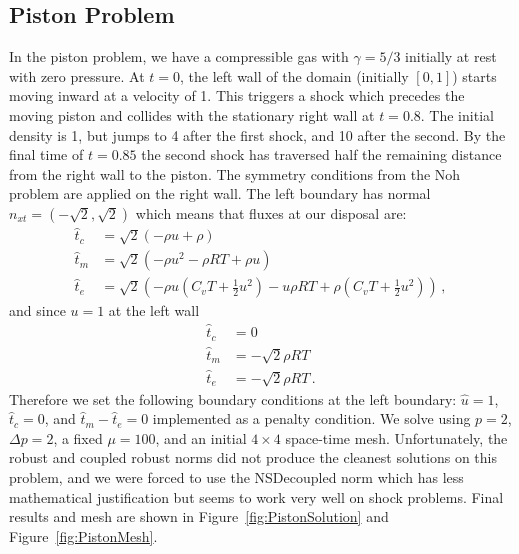 \documentclass[Dissertation.tex]{subfiles}
\begin{document}
\subsection{Piston Problem}
\label{sec:piston}
In the piston problem, we have a compressible gas with $\gamma=5/3$ initially at rest with zero pressure.
At $t=0$, the left wall of the domain (initially $[0,1]$) starts moving inward at a velocity of 1.
This triggers a shock which precedes the moving piston and collides with the stationary right wall 
at $t=0.8$. The initial density is 1, but jumps to 4 after the first shock, and 10 after the second.
By the final time of $t=0.85$ the second shock has traversed half the remaining distance from
the right wall to the piston.
The symmetry conditions from the Noh problem are applied on the right wall. 
The left boundary has normal $n_{xt}=(-\sqrt{2},\sqrt{2})$ which means that fluxes at our disposal are:
\begin{align*}
\hat t_c&=\sqrt{2}(-\rho u+\rho)\\
\hat t_m&=\sqrt{2}(-\rho u^2-\rho RT+\rho u)\\
\hat t_e&=\sqrt{2}(-\rho u(C_vT+\frac{1}{2}u^2)-u\rho RT+\rho(C_vT+\frac{1}{2}u^2))\,,
\end{align*}
and since $u=1$ at the left wall
\begin{align*}
\hat t_c&=0\\
\hat t_m&=-\sqrt{2}\rho RT\\
\hat t_e&=-\sqrt{2}\rho RT\,.
\end{align*}
Therefore we set the following boundary conditions at the left boundary: $\hat u=1$, $\hat t_c=0$, 
and $\hat t_m-\hat t_e=0$ implemented as a penalty condition.
We solve using $p=2$, $\Delta p=2$, a fixed $\mu=100$, and an initial $4\times4$ space-time mesh.
Unfortunately, the robust and coupled robust norms did not produce the cleanest solutions
on this problem, and we were forced to use the NSDecoupled norm which has
less mathematical justification but seems to work very well on shock problems.
Final results and mesh are shown in Figure~\ref{fig:PistonSolution} and Figure~\ref{fig:PistonMesh}.
\end{document}
